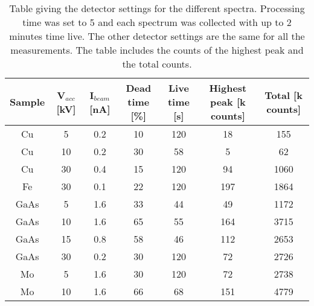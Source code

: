 \begin{table}[ht]
    \centering
    \caption{
        Table giving the detector settings for the different spectra.
        Processing time was set to 5 and each spectrum was collected with up to 2 minutes time live.
        The other detector settings are the same for all the measurements.
        The table includes the counts of the highest peak and the total counts.
    }
    \label{tab:method:detector:settings}
    \begin{tabular}{ccccccc}
        Sample & V$_{acc}$ [kV] & I$_{beam}$ [nA] & Dead time [\%] & Live time [s] & Highest peak [k counts] & Total [k counts] \\
        \hline
        Cu     & 5              & 0.2             & 10             & 120           & 18                      & 155              \\
        Cu     & 10             & 0.2             & 30             & 58            & 5                       & 62               \\
        Cu     & 30             & 0.4             & 15             & 120           & 94                      & 1060             \\
        Fe     & 30             & 0.1             & 22             & 120           & 197                     & 1864             \\
        GaAs   & 5              & 1.6             & 33             & 44            & 49                      & 1172             \\
        GaAs   & 10             & 1.6             & 65             & 55            & 164                     & 3715             \\
        GaAs   & 15             & 0.8             & 58             & 46            & 112                     & 2653             \\
        GaAs   & 30             & 0.2             & 30             & 120           & 72                      & 2726             \\
        Mo     & 5              & 1.6             & 30             & 120           & 72                      & 2738             \\
        Mo     & 10             & 1.6             & 66             & 68            & 151                     & 4779             \\

\end{tabular}
\end{table}
